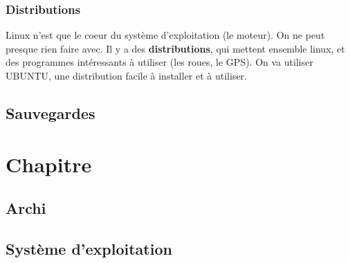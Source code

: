 \documentclass{book}
\def\keyword{\textbf}
\begin{document}
\subsection{Distributions}
Linux n'est que le coeur du système d'exploitation (le moteur). On ne peut presque rien faire avec. Il y a des \keyword{distributions}, qui mettent ensemble linux, et des programmes intéressants à utiliser (les roues, le GPS). On va utiliser UBUNTU, une distribution facile à installer et à utiliser.

\section{Sauvegardes}

\chapter{Chapitre}

\section{Archi}

\section{Système d'exploitation}
\label{sec:Système d'exploitation}
\end{document}
